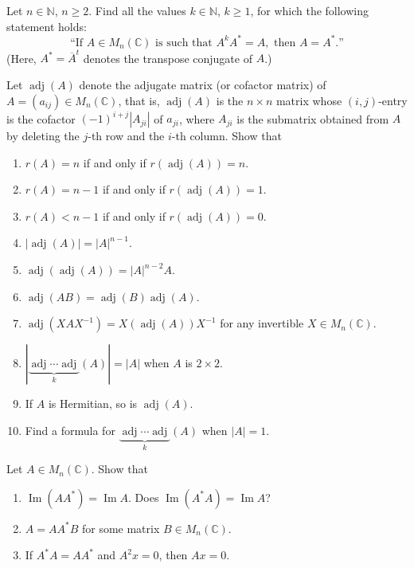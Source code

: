 \documentclass[12pt]{article}
\begin{document}
\begin{problem}
Let $n\in\mathbb{N}$, $n\ge 2$. Find all the values $k\in\mathbb{N}$, $k\ge 1$, for which the following statement holds:
\[
\text{``If } A\in M_n(\mathbb{C}) \text{ is such that } A^kA^*=A, \text{ then } A=A^*.\text{''} \tag{$*$}
\]
(Here, $A^*=\overline{A}^t$ denotes the transpose conjugate of $A$.)
\end{problem}

\begin{problem}
Let $\operatorname{adj}(A)$ denote the adjugate matrix (or cofactor matrix) of $A=(a_{ij})\in M_n(\mathbb{C})$, that is, $\operatorname{adj}(A)$ is the $n\times n$ matrix whose $(i,j)$-entry is the cofactor $(-1)^{i+j}|A_{ji}|$ of $a_{ji}$, where $A_{ji}$ is the submatrix obtained from $A$ by deleting the $j$-th row and the $i$-th column. Show that
\begin{enumerate}[label=(\alph*)]
\item $r(A)=n$ if and only if $r(\operatorname{adj}(A))=n$.
\item $r(A)=n-1$ if and only if $r(\operatorname{adj}(A))=1$.
\item $r(A)<n-1$ if and only if $r(\operatorname{adj}(A))=0$.
\item $|\operatorname{adj}(A)| = |A|^{n-1}$.
\item $\operatorname{adj}(\operatorname{adj}(A)) = |A|^{n-2}A$.
\item $\operatorname{adj}(AB) = \operatorname{adj}(B)\operatorname{adj}(A)$.
\item $\operatorname{adj}(XAX^{-1}) = X(\operatorname{adj}(A))X^{-1}$ for any invertible $X\in M_n(\mathbb{C})$.
\item $|\underbrace{\operatorname{adj}\cdots\operatorname{adj}}_{k}(A)| = |A|$ when $A$ is $2\times 2$.
\item If $A$ is Hermitian, so is $\operatorname{adj}(A)$.
\item Find a formula for $\underbrace{\operatorname{adj}\cdots\operatorname{adj}}_{k}(A)$ when $|A|=1$.
\end{enumerate}
\end{problem}

\begin{problem}
Let $A\in M_n(\mathbb{C})$. Show that
\begin{enumerate}[label=(\alph*)]
\item $\operatorname{Im}(AA^*)=\operatorname{Im}A$. Does $\operatorname{Im}(A^*A)=\operatorname{Im}A$?
\item $A=AA^*B$ for some matrix $B\in M_n(\mathbb{C})$.
\item If $A^*A=AA^*$ and $A^2x=0$, then $Ax=0$.
\end{enumerate}
\end{problem}
\end{document}
